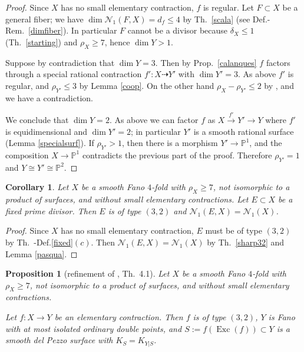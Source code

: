 \documentclass[a4paper,12pt]{amsart}
\newtheorem{corollary}[thm]{Corollary}
\newtheorem{proposition}[thm]{Proposition}
\theoremstyle{definition}
\numberwithin{figure}{section}
\numberwithin{table}{section}
\newcommand{\pr}{\mathbb{P}}
\newcommand{\N}{\mathcal{N}_1}
\newcommand{\Exc}{\operatorname{Exc}}
\begin{document}
             \begin{proof}
           Since $X$ has no small elementary contraction, $f$ is regular.    Let $F\subset X$ be a general fiber; we have $\dim\N(F,X)=d_f\leq 4$ by Th.~\ref{scala} (see Def.-Rem.~\ref{dimfiber}). In particular $F$ cannot be a divisor because $\delta_X\leq 1$ (Th.~\ref{starting}) and $\rho_X\geq 7$, hence $\dim Y>1$.

               Suppose by contradiction that $\dim Y=3$. Then by Prop.~\ref{calanques} $f$ factors through a special rational contraction $f'\colon X\dasharrow Y'$ with $\dim Y'=3$. As above $f'$ is regular, and $\rho_{Y'}\leq 3$ by Lemma \ref{coop}. On the other hand $\rho_X-\rho_{Y'}\leq 2$ by \cite[Lemma 3.12]{3folds}, and we have a contradiction.

               We conclude that $\dim Y=2$. As above we can factor $f$ as $X\stackrel{f'}{\to} Y'\to Y$ where $f'$ is equidimensional and $\dim Y'=2$; in particular $Y'$ is a smooth rational surface (Lemma \ref{specialsurf}). If $\rho_{Y'}>1$, then there is a morphism $Y'\to\pr^1$, and the composition $X\to\pr^1$ contradicts the previous part of the proof. Therefore $\rho_{Y'}=1$ and $Y\cong Y'\cong\pr^2$.
             \end{proof}
               \begin{corollary}\label{FBI}
                 Let $X$ be a smooth Fano $4$-fold with $\rho_X\geq 7$, not isomorphic to a product of surfaces, and without small elementary contractions. Let $E\subset X$ be a fixed prime divisor. Then $E$ is of type $(3,2)$ and 
$\N(E,X)=\N(X)$.
               \end{corollary}
               \begin{proof}
 Since $X$ has no small   elementary contraction,   $E$ must be of type $(3,2)$           by Th.~-Def.\ref{fixed}$(c)$. Then $\N(E,X)=\N(X)$
               by Th.~\ref{sharp32} and Lemma \ref{pasqua}.
                 \end{proof}
           \begin{proposition}[refinement of \cite{32}, Th.~4.1]\label{cono}
             Let $X$ be a smooth Fano $4$-fold with $\rho_X\geq 7$, not isomorphic to a product of surfaces, and without small elementary contractions.
             
Let $f\colon X\to Y$ be an elementary contraction.
Then
 $f$ is of type $(3,2)$,
 $Y$ is Fano with at most isolated ordinary double points, and $S:=f(\Exc(f))\subset Y$ is a smooth del Pezzo surface with $K_S=K_{Y|S}$. 
\end{proposition}
\end{document}
